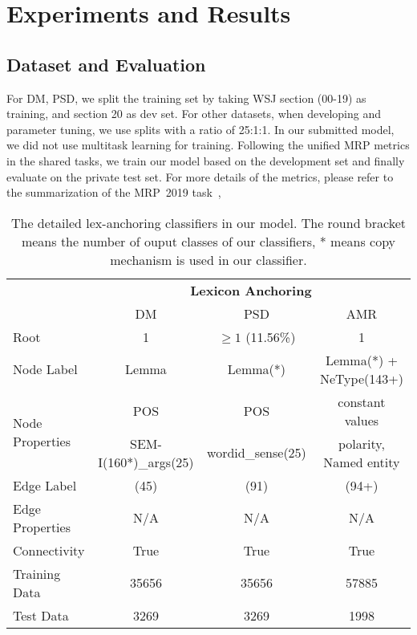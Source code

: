 \section{Experiments and Results}
\label{sec:lex-phr:exp}

\subsection{Dataset and Evaluation}
\label{ssec:data_eval}

For DM, PSD, we split the training set by taking WSJ section (00-19)
as training, and section 20 as dev set. For other datasets, when
developing and parameter tuning, we use splits with a ratio of
25:1:1. In our submitted model, we did not use multitask learning for
training. Following the unified MRP metrics in the shared tasks, we
train our model based on the development set and finally evaluate on
the private test set.  For more details of the metrics, please refer
to the summarization of the MRP~2019 task~\cite{Oep:Abe:Haj:19},
\begin{table}[!ht]
\begin{center}
\small
\begin{tabular}{l|ccc}
\toprule
\hline
                                 & \multicolumn{3}{c}{{\bf Lexicon Anchoring}}                         \\ \cline{2-4}
                                 & DM                    & PSD               & AMR                     \\ \hline
Root                             & 1                     & $ \geq 1$ (11.56\%)  & 1                       \\ \hline
Node Label                       & Lemma                 & Lemma(*)          & Lemma(*) + NeType(143+) \\ \hline
\multirow{2}{*}{Node Properties} & POS                   & POS               & constant values         \\
                                 & SEM-I(160*)\_args(25) & wordid\_sense(25) & polarity, Named entity  \\ \hline
Edge Label                       & (45)                  & (91)              & (94+)                   \\ \hline
Edge Properties                  & N/A                   & N/A               & N/A                     \\ \hline
Connectivity                     & True                  & True              & True                    \\ \hline
Training Data                    & 35656                 & 35656             & 57885                   \\ \hline
Test Data                        & 3269                  & 3269              & 1998                    \\ \hline \bottomrule
\end{tabular}
\end{center}
\caption{The detailed lex-anchoring classifiers in our model. The
  round bracket means the number of ouput classes of our classifiers,
  * means copy mechanism is used in our classifier. }
\label{tbl:lex:impl_lex}
\end{table}


